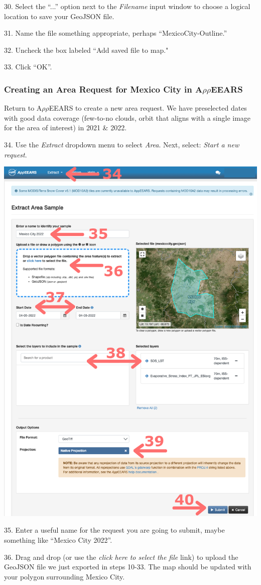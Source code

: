 \documentclass[oneside,a4paper,11pt,explicit]{book}
\begin{document}
30. Select the ``...'' option next to the \textit{Filename} input window to choose a logical location to save your GeoJSON file.

31. Name the file something appropriate, perhaps ``MexicoCity-Outline.'' 

32. Uncheck the box labeled ``Add saved file to map." 

33. Click ``OK''.

\subsubsection{Creating an Area Request for Mexico City in A$\rho\rho$EEARS}

Return to A$\rho\rho$EEARS to create a new area request. We have preselected dates with good data coverage (few-to-no clouds, orbit  that aligns with a single image for the area of interest) in 2021 \& 2022. 

34. Use the \textit{Extract} dropdown menu to select \textit{Area}. Next, select: \textit{Start a new request}. 

\vspace{.5em}

\centerline{\includegraphics[width=.6\textwidth]{ESIareaRequest.png}}

\vspace{.5em}

35. Enter a useful name for the request you are going to submit, maybe something like ``Mexico City 2022''. 

36. Drag and drop (or use the \textit{click here to select the file} link) to upload the GeoJSON file we just exported in steps 10-33. The map should be updated with your polygon surrounding Mexico City.
\end{document}

